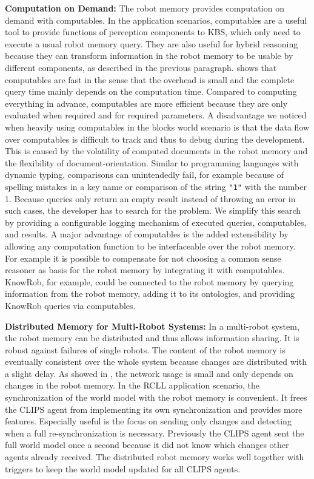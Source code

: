 \textbf{Computation on Demand:}
The robot memory provides computation on demand with computables. In
the application scenarios, computables are a useful tool to provide
functions of perception components to KBS, which only need to execute
a usual robot memory query. They are also useful for hybrid reasoning
because they can transform information in the robot memory to be
usable by different components, as described in the previous
paragraph.  shows that
computables are fast in the sense that the overhead is small and the
complete query time mainly depends on the computation time. Compared
to computing everything in advance, computables are more efficient because
they are only evaluated when required and for required parameters.
A disadvantage we noticed when heavily using computables in the blocks
world scenario is that the data flow over computables is difficult to
track and thus to debug during the development. This is caused by the
volatility of computed documents in the robot memory and the
flexibility of document-orientation. Similar to programming
languages with dynamic typing, comparisons can unintendedly fail, for
example because of spelling mistakes in a key name or comparison
of the string \texttt{"1"} with the number 1. Because queries
only return an empty result instead of throwing an error in such
cases, the developer has to search for the problem. We
simplify this search by providing a configurable logging mechanism of
executed queries, computables, and results.
A major advantage of computables is the added extensibility by
allowing any computation function to be interfaceable over the robot
memory. For example it is possible to compensate for not choosing a
common sense reasoner as basis for the robot memory by integrating it
with computables. KnowRob, for example, could be connected to the
robot memory by querying information from the robot memory, adding it
to its ontologies, and providing KnowRob queries via computables.

\textbf{Distributed Memory for Multi-Robot Systems:} 
In a multi-robot system, the robot memory can be distributed and thus
allows information sharing. It is robust against failures of single
robots. The content of the robot memory is
eventually consistent over the whole system because changes are
distributed with a slight delay.  As showed in , the network
usage is small and only depends on changes in the robot memory. In the
RCLL application scenario, the synchronization of the world model with
the robot memory is convenient. It frees the CLIPS agent from
implementing its own synchronization and provides more
features. Especially useful is the focus on sending only changes and
detecting when a full re-synchronization is necessary. Previously the
CLIPS agent sent the full world model once a second because it did not
know which changes other agents already received. The distributed
robot memory works well together with triggers to keep the world model
updated for all CLIPS agents.

